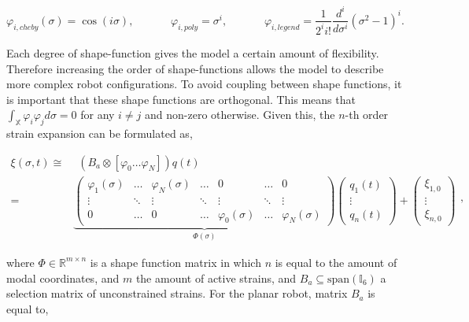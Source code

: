 \begin{equation}
    \varphi_{i,cheby}(\sigma) = \cos(i \sigma), \hspace{40pt} \varphi_{i,poly} = \sigma^i, \hspace{40pt} \varphi_{i,legend} = \frac{1}{2^i i!} \frac{d^i}{d\sigma^i}(\sigma^2-1)^i.
    \label{eq2:shapefunction}
\end{equation}


Each degree of shape-function gives the model a certain amount of flexibility. Therefore increasing the order of shape-functions allows the model to describe more complex robot configurations. To avoid coupling between shape functions,  it is important that these shape functions are orthogonal. This means that $\int_\mathbb{X} \varphi_i \varphi_j d \sigma = 0$ for any $i \neq j$ and non-zero otherwise. Given this, the $n$-th order strain expansion can be formulated as,


\begin{equation}
\begin{aligned}
    \xi(\sigma,t) \cong & \hspace{5pt}  (B_a \otimes [ \varphi_0 \dots \varphi_N ])q(t)\\ = &  \underbrace{ \begin{pmatrix}
    \varphi_1(\sigma) & \dots  & \varphi_N(\sigma) & \dots     & 0      & \dots  &  0 \\
    \vdots    & \ddots & \vdots    & \ddots    & \vdots & \ddots & \vdots \\
    0         & \dots  & 0         & \dots     & \varphi_0(\sigma) & \dots & \varphi_N (\sigma)
    \end{pmatrix}}_{\Phi(\sigma)} \begin{pmatrix} q_1(t) \\ \vdots \\ q_n(t) \end{pmatrix} +  \begin{pmatrix} \xi_{1,0} \\ \vdots \\ \xi_{n,0}   \end{pmatrix}
    \end{aligned},
\label{eq2:xishape}
\end{equation}

where $\Phi \in \mathbb{R}^{m \times n}$ is a shape function matrix in which $n$ is equal to the amount of modal coordinates, and $m$ the amount of active strains, and $B_a \subseteq \text{span}(\mathbb{I}_6)$ a selection matrix of unconstrained strains. For the planar robot, matrix $B_a$ is equal to,

